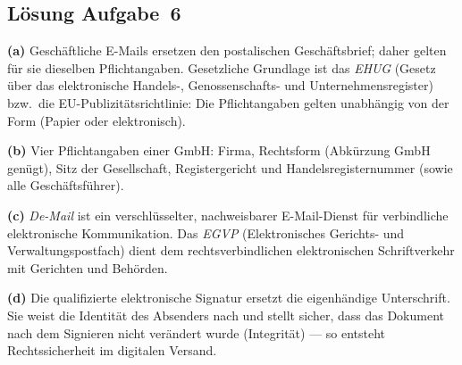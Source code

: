 \documentclass[11pt, a4paper]{article}
\begin{document}
\subsection*{Lösung Aufgabe~6}
\begin{loesung}
\textbf{(a)} Geschäftliche E-Mails ersetzen den postalischen Geschäftsbrief; daher gelten
für sie dieselben Pflichtangaben. Gesetzliche Grundlage ist das \emph{EHUG} (Gesetz über
das elektronische Handels-, Genossenschafts- und Unternehmensregister) bzw.\ die
EU-Publizitätsrichtlinie: Die Pflichtangaben gelten unabhängig von der Form (Papier oder
elektronisch).

\textbf{(b)} Vier Pflichtangaben einer GmbH: Firma, Rechtsform (Abkürzung GmbH genügt),
Sitz der Gesellschaft, Registergericht und Handelsregisternummer (sowie alle
Geschäftsführer).

\textbf{(c)} \emph{De-Mail} ist ein verschlüsselter, nachweisbarer E-Mail-Dienst für
verbindliche elektronische Kommunikation. Das \emph{EGVP} (Elektronisches Gerichts- und
Verwaltungspostfach) dient dem rechtsverbindlichen elektronischen Schriftverkehr mit
Gerichten und Behörden.

\textbf{(d)} Die qualifizierte elektronische Signatur ersetzt die eigenhändige
Unterschrift. Sie weist die Identität des Absenders nach und stellt sicher, dass das
Dokument nach dem Signieren nicht verändert wurde (Integrität) --- so entsteht
Rechtssicherheit im digitalen Versand.
\end{loesung}
\end{document}
